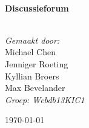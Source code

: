 \begin{titlepage}

\begin{center}


\HRule \\[0.4cm]
{ \huge \bfseries Discussieforum}\\[0.4cm]
\HRule \\[0.4cm]

\vfill

\end{center}

\begin{minipage}{0.4\textwidth}
\begin{flushleft} \large
\emph{Gemaakt door:}\\
Michael Chen\\ Jenniger Roeting\\ Kyllian Broers \\ Max Bevelander \\
\emph{Groep: Webdb13KIC1}
\end{flushleft}

\end{minipage}
\vfill
{\large \today}

\end{titlepage}